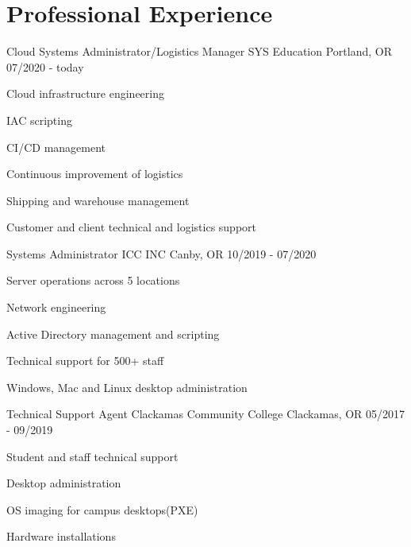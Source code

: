 \section{Professional Experience}
\cventry
{Cloud Systems Administrator/Logistics Manager} %
{SYS Education} %
{Portland, OR} %
{07/2020 - today} %
\begin{cvitems}
\item {Cloud infrastructure engineering}
\item {IAC scripting}
\item {CI/CD management}
\item {Continuous improvement of logistics}
\item {Shipping and warehouse management}
\item {Customer and client technical and logistics support}
\end{cvitems}

\cventry
{Systems Administrator} %
{ICC INC} %
{Canby, OR} %
{10/2019 - 07/2020} %
\begin{cvitems}
\item {Server operations across 5 locations}
\item {Network engineering}
\item {Active Directory management and scripting}
\item {Technical support for 500+ staff}
\item {Windows, Mac and Linux desktop administration}
\end{cvitems}

\cventry
{Technical Support Agent} %
{Clackamas Community College} %
{Clackamas, OR} %
{05/2017 - 09/2019} %
\begin{cvitems}
\item {Student and staff technical support}
\item {Desktop administration}
\item {OS imaging for campus desktops(PXE)}
\item {Hardware installations}
\end{cvitems}
